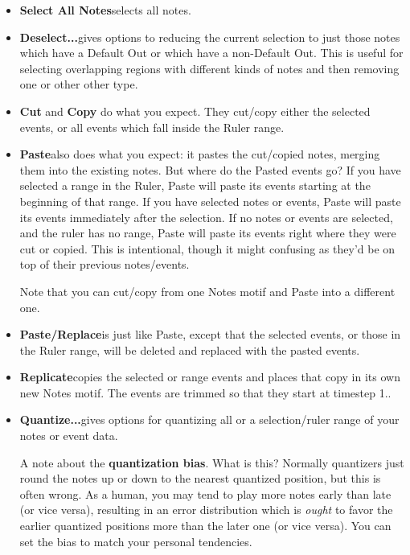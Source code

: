 \documentclass[twoside,10pt]{article}
\begin{document}
\begin{itemize}


\item{\bf Select All Notes}\quad selects all notes.

\item{\bf Deselect...}\quad gives options to reducing the current selection to just those notes which have a Default Out or which have a non-Default Out.  This is useful for selecting overlapping regions with different kinds of notes and then removing one or other other type. 

\item{\bf Cut} and {\bf Copy} do what you expect.  They cut/copy either the selected events, or all events which fall inside the Ruler range.

\item {\bf Paste}\quad also does what you expect: it pastes the cut/copied notes, merging them into the existing notes.  But where do the Pasted events go?  If you have selected a range in the Ruler, Paste will paste its events starting at the beginning of that range.  If you have selected notes or events, Paste will paste its events immediately after the selection.  If no notes or events are selected, and the ruler has no range, Paste will paste its events right where they were cut or copied.  This is intentional, though it might confusing as they'd be on top of their previous notes/events.

Note that you can cut/copy from one Notes motif and Paste into a different one.

\item {\bf Paste/Replace}\quad is just like Paste, except that the selected events, or those in the Ruler range, will be deleted and replaced with the pasted events.

\item {\bf Replicate}\quad copies the selected or range events and places that copy in its own new Notes motif.  The events are trimmed so that they start at timestep 1..

\item{\bf Quantize...}\quad gives options for quantizing all or a selection/ruler range of your notes or event data. 

 A note about  the {\bf quantization bias}.  What is this?  Normally quantizers just round the notes up or down to the nearest quantized position, but this is often wrong.  As a human, you may tend to play more notes early than late (or vice versa), resulting in an error distribution which is {\it ought} to favor the earlier quantized positions more than the later one (or vice versa).  You can set the bias to match your personal tendencies.


\end{itemize}
\end{document}
